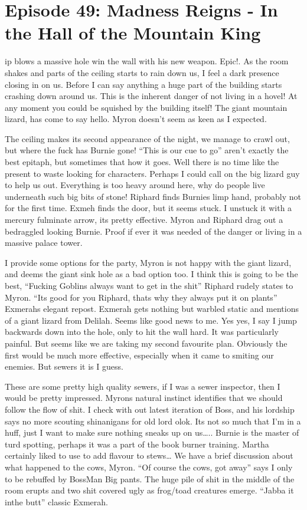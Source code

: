 \section{Episode 49: Madness Reigns - In the Hall of the Mountain King}

\begin{multicols}{2}

ip blows a massive hole win the wall with his new weapon. Epic!. As the room shakes and parts of the ceiling starts to rain down us, I feel a dark presence closing in on us. Before I can say anything a huge part of the building starts crashing down around us. This is the inherent danger of not living in a hovel! At any moment you could be squished by the building itself! The giant mountain lizard, has come to say hello. Myron doesn’t seem as keen as I expected.\medskip

The ceiling makes its second appearance of the night, we manage to crawl out, but where the fuck has Burnie gone! “This is our cue to go” aren’t exactly the best epitaph, but sometimes that how it goes. Well there is no time like the present to waste looking for characters. Perhaps I could call on the big lizard guy to help us out. Everything is too heavy around here, why do people live underneath such big bits of stone! Riphard finds Burnies limp hand, probably not for the first time. Exmeh finds the door, but it seems stuck. I unstuck it with a mercury fulminate arrow, its pretty effective. Myron and Riphard drag out a bedraggled looking Burnie. Proof if ever it was needed of the danger or living in a massive palace tower.\medskip

I provide some options for the party, Myron is not happy with the giant lizard, and deems the giant sink hole as a bad option too. I think this is going to be the best, “Fucking Goblins always want to get in the shit” Riphard rudely states to Myron. “Its good for you Riphard, thats why they always put it on plants” Exmerahs elegant repost. Exmerah gets nothing but warbled static and mentions of a giant lizard from Delilah. Seems like good news to me. Yes yes, I say I jump backwards down into the hole, only to hit the wall hard. It was particularly painful. But seems like we are taking my second favourite plan. Obviously the first would be much more effective, especially when it came to smiting our enemies. But sewers it is I guess.\medskip

These are some pretty high quality sewers, if I was a sewer inspector, then I would be pretty impressed. Myrons natural instinct identifies that we should follow the flow of shit. I check with out latest iteration of Boss, and his lordship says no more scouting shinanigans for old lord olok. Its not so much that I’m in a huff, just I want to make sure nothing sneaks up on us….. Burnie is the master of turd spotting, perhaps it was a part of the book burner training. Martha certainly liked to use to add flavour to stews… We have a brief discussion about what happened to the cows, Myron. “Of course the cows, got away” says I only to be rebuffed by BossMan Big pants. The huge pile of shit in the middle of the room erupts and two shit covered ugly as frog/toad creatures emerge. “Jabba it inthe butt” classic Exmerah. \medskip


\end{multicols}
